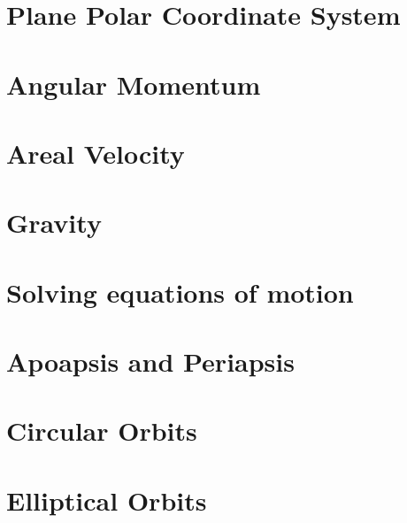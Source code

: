 \documentclass[a5paper,12pt]{article}
\begin{document}

\clearpage
\tableofcontents
\listoftables
\listoffigures
\clearpage

\section{Plane Polar Coordinate System}

\clearpage

\section{Angular Momentum}

\clearpage

\section{Areal Velocity}

\clearpage

\section{Gravity}\label{sec:Gravity}

\clearpage

\section{Solving equations of motion}

\clearpage

\section{Apoapsis and Periapsis}

\clearpage

\section{Circular Orbits}

\clearpage

\section{Elliptical Orbits}

\clearpage

\clearpage
{}
\printindex
\end{document}
